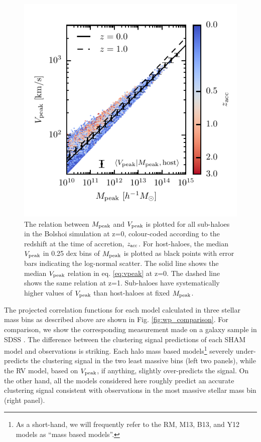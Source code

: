 \documentclass[a4paper,fleqn,usenatbib]{mnras}
\begin{document}
\begin{figure}
    \includegraphics{figures/mpeak_vs_vpeak.pdf}
    \caption{The relation between $M_{\rm peak}$ and $V_{\rm peak}$ is plotted for all sub-haloes in the Bolshoi simulation at z=0, colour-coded according to the redshift at the time of accretion, $z_{\rm acc}$.  For host-haloes, the median $V_{\rm peak}$ in 0.25 dex bins of $M_{\rm peak}$ is plotted as black points with error bars indicating the log-normal scatter.  The solid line shows the median $V_{\rm peak}$ relation in eq. \ref{eq:vpeak} at z=0.  The dashed line shows the same relation at z=1.  Sub-haloes have systematically higher values of $V_{\rm peak}$ than host-haloes at fixed $M_{\rm peak}$.}
    \label{fig:mpeak_vpeak}
\end{figure}

The projected correlation functions for each model calculated in three stellar mass bins as described above are shown in Fig. \ref{fig:wp_comparison}.  For comparison, we show the corresponding measurement made on a galaxy sample in SDSS \citep[``Mass-limit'' sample in][]{Yang:2012ew}.  The difference between the clustering signal predictions of each SHAM model and observations is striking.  Each halo mass based models\footnote{As a short-hand, we will frequently refer to the RM, M13, B13, and Y12 models as ``mass based models''.} severely under-predicts the clustering signal in the two least massive bins (left two panels), while the RV model, based on $V_{\rm peak}$, if anything, slightly over-predicts the signal.  On the other hand, all the models considered here roughly predict an accurate clustering signal consistent with observations in the most massive stellar mass bin (right panel).
\end{document}
